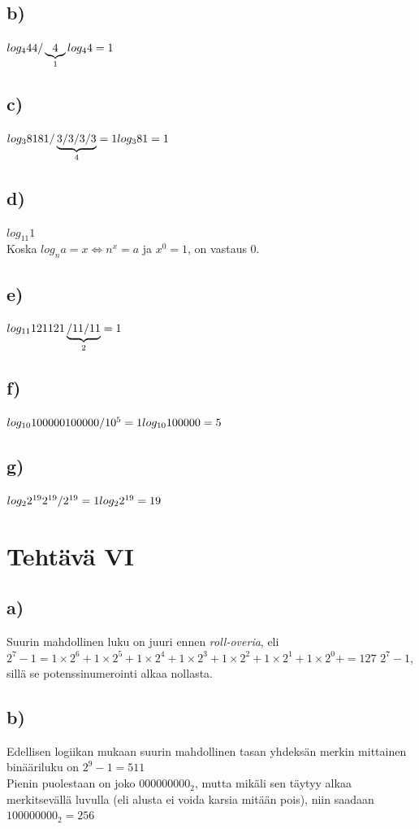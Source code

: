 \documentclass[a4paper, 12pt]{article}
\begin{document}
\subsection*{b)}
$log_{4}4 \\
4/\underbrace{4}_\text{1}\\
log_{4}4=1$
\subsection*{c)}
$log_{3} 81 \\
81/\underbrace{3/3/3/3}_{4}=1 \\
log_{3}81=1
$
\subsection*{d)}
$log_{11}1$\\
Koska $log_{n}a=x \Leftrightarrow n^{x}=a$ ja $x^{0}=1$, on vastaus $0$.
\subsection*{e)}
$log_{11}121\\
121\underbrace{/11/11}_{2}=1$
\subsection*{f)}
$log_{10}100000\\
100000/10^{5}=1\\
log_{10}100000=5$
\subsection*{g)}
$log_{2}2^{19}\\
2^{19}/2^{19}=1\\
log_{2}2^{19}=19$

\section*{Tehtävä VI}
\subsection*{a)}
Suurin mahdollinen luku on juuri ennen \emph{roll-overia}, eli $2^{7}-1=1 \times 2^6 +1 \times 2^5 +1 \times 2^4 +1 \times 2^3 +1 \times 2^2 +1 \times 2^1 +1 \times 2^0 +=127$
$2^{7}-1$, sillä se potenssinumerointi alkaa nollasta.
\subsection*{b)}
Edellisen logiikan mukaan suurin mahdollinen tasan yhdeksän merkin mittainen binääriluku on $2^9-1=511$\\
Pienin puolestaan on joko $000000000_2$, mutta mikäli sen täytyy alkaa merkitsevällä luvulla (eli alusta ei voida karsia mitään pois), niin saadaan $100000000_2=256$
\end{document}
